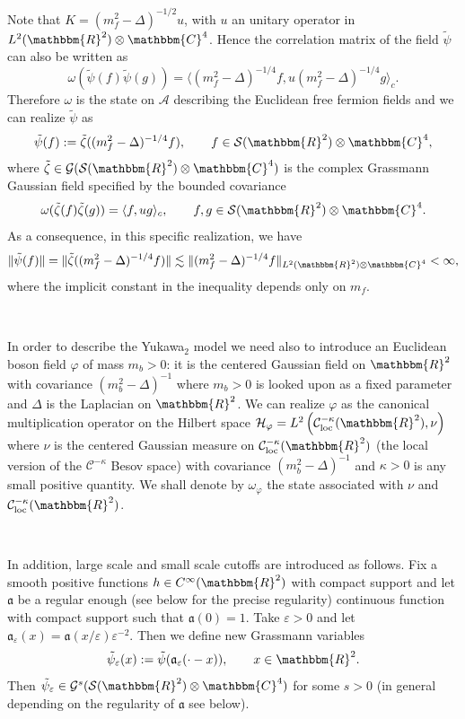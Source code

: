 \documentclass[11pt]{article}
\newcommand{\assign}{:=}
\begin{document}
Note that $K = (m_f^2 - \Delta)^{- 1 / 2} u$, with $u$ an unitary operator in
$L^2 (\mathbbm{R}^2) \otimes \mathbbm{C}^4$. Hence the correlation matrix of the
field $\tilde{\psi}$ can also be written as
\[ \omega (\tilde{\psi} (f) \tilde{\psi} (g)) = \langle (m_f^2 - \Delta)^{- 1
   / 4} f, u (m_f^2 - \Delta)^{- 1 / 4} g \rangle_c . \]
Therefore $\omega$ is the state on $\mathcal{A}$ describing the Euclidean free
fermion fields and we can realize $\tilde{\psi}$ as
\[ \tilde{\psi} (f) \assign \tilde{\zeta} ((m_f^2 - \Delta)^{- 1 / 4} f),
   \qquad f \in \mathcal{S} (\mathbbm{R}^2) \otimes \mathbbm{C}^4, \]
where $\tilde{\zeta} \in \mathcal{G} (\mathcal{S} (\mathbbm{R}^2) \otimes
\mathbbm{C}^4)$ is the complex Grassmann Gaussian field specified by the
bounded covariance
\[ \omega (\tilde{\zeta} (f) \tilde{\zeta} (g)) = \langle f, u g \rangle_c,
   \qquad f, g \in \mathcal{S} (\mathbbm{R}^2) \otimes \mathbbm{C}^4 . \]
As a consequence, in this specific realization, we have
\begin{equation}
  \| \tilde{\psi} (f) \| = \| \tilde{\zeta} ((m_f^2 - \Delta)^{- 1 / 4} f) \|
  \lesssim \| (m_f^2 - \Delta)^{- 1 / 4} f \|_{L^2 (\mathbbm{R}^2) \otimes
  \mathbbm{C}^4} < \infty, \label{eq:dirac-reg}
\end{equation}
where the implicit constant in the inequality depends only on $m_f$.

\

In order to describe the Yukawa$_2$ model we need also to introduce an
Euclidean boson field $\varphi$ of mass $m_b > 0$: it is the centered Gaussian
field on $\mathbbm{R}^2$ with covariance $(m^2_b - \Delta)^{- 1}$ where $m_b >
0$ is looked upon as a fixed parameter and $\Delta$ is the Laplacian on
$\mathbbm{R}^2$. We can realize $\varphi$ as the canonical multiplication
operator on the Hilbert space $\mathcal{H}_{\varphi} = L^2 \left(
\mathcal{C}^{- \kappa}_{\text{loc}} (\mathbbm{R}^2), \nu \right)$ where $\nu$
is the centered Gaussian measure on $\mathcal{C}^{- \kappa}_{\text{loc}}
(\mathbbm{R}^2)$ (the local version of the $\mathcal{C}^{- \kappa}$ Besov
space) with covariance $(m^2_b - \Delta)^{- 1}$ and $\kappa > 0$ is any small
positive quantity. We shall denote by $\omega_{\varphi}$ the state associated
with $\nu$ and $\mathcal{C}^{- \kappa}_{\text{loc}} (\mathbbm{R}^2)$.

\

In addition, large scale and small scale cutoffs are introduced as follows.
Fix a smooth positive functions $h \in C^{\infty} (\mathbbm{R}^2)$ with compact
support and let $\mathfrak{a}$ be a regular enough (see below for the precise
regularity) continuous function with compact support such that $\mathfrak{a}
(0) = 1$. Take $\varepsilon > 0$ and let $\mathfrak{a}_{\varepsilon} (x) =
\mathfrak{a} (x / \varepsilon) \varepsilon^{- 2}$. Then we define new
Grassmann variables
\[ \tilde{\psi}_{\varepsilon} (x) \assign \tilde{\psi}
   (\mathfrak{a}_{\varepsilon} (\cdot - x)), \qquad x \in \mathbbm{R}^2 . \]
Then $\tilde{\psi}_{\varepsilon} \in \mathcal{G}^s (\mathcal{S} (\mathbbm{R}^2)
\otimes \mathbbm{C}^4)$ for some $s > 0$ (in general depending on the
regularity of $\mathfrak{a}$ see below).
\end{document}

